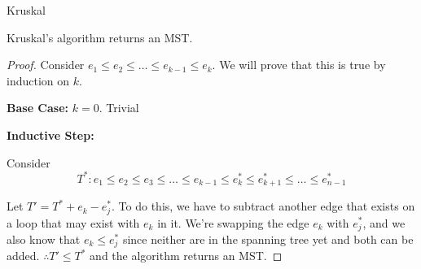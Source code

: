 \documentclass[12pt]{article}
\begin{document}
\begin{algorithm}
	\label{alg:kruskal}
	\caption{Kruskal}
	\begin{algorithmic}[1]
		\ENDFOR
	\end{algorithmic}
\end{algorithm}

\begin{thm}
	Kruskal's algorithm returns an MST.
	\begin{proof}
		Consider $e_1 \le e_2 \le \dots \le e_{k-1} \le e_k$. We will prove that
		this is true by induction on $k$.

		\textbf{Base Case:} $k=0$. Trivial

		\textbf{Inductive Step:}

		Consider 
		\begin{equation}
			T^*: e_1 \le e_2 \le e_3 \le \dots \le e_{k-1} \le e^*_k \le
			e_{k+1}^* \le \dots \le e_{n-1}^*
			\label{eq:pkrus1}
		\end{equation}

		Let $T' = T^* + e_k - e_j^*$. To do this, we have to subtract another edge that
		exists on a loop that may exist with $e_k$ in it. We're swapping
		the edge $e_k$ with $e_j^*$, and we also know that $e_k \le e_j^*$ since
		neither are in the spanning tree yet and both can be added. $\therefore
		T' \le T^*$ and the algorithm returns an MST.
	\end{proof}
\end{thm}
\end{document}
